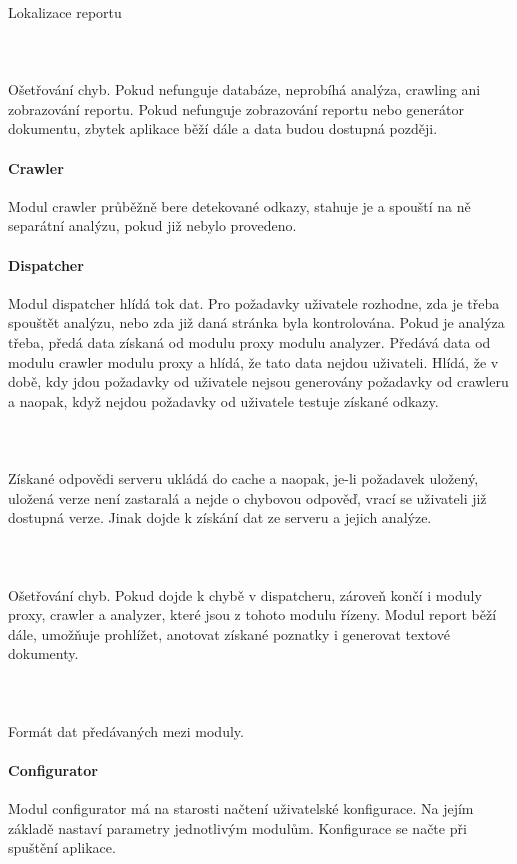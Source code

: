 \documentclass[10pt]{article}
\begin{document}
	\paragraph{~}Lokalizace reportu
	\paragraph{~}Ošetřování chyb. Pokud nefunguje databáze, neprobíhá analýza, crawling ani zobrazování reportu. Pokud nefunguje zobrazování reportu nebo generátor dokumentu, zbytek aplikace běží dále a data budou dostupná později.
	\paragraph{Crawler} Modul crawler průběžně bere detekované odkazy, stahuje je a spouští na ně separátní analýzu, pokud již nebylo provedeno.
	\paragraph{Dispatcher} Modul dispatcher hlídá tok dat. Pro požadavky uživatele rozhodne, zda je třeba spouštět analýzu, nebo zda již daná stránka byla kontrolována. Pokud je analýza třeba, předá data získaná od modulu proxy modulu analyzer. Předává data od modulu crawler modulu proxy a hlídá, že tato data nejdou uživateli. Hlídá, že v době, kdy jdou požadavky od uživatele nejsou generovány požadavky od crawleru a naopak, když nejdou požadavky od uživatele testuje získané odkazy. 
	\paragraph{~} Získané odpovědi serveru ukládá do cache a naopak, je-li požadavek uložený, uložená verze není zastaralá a nejde o chybovou odpověď, vrací se uživateli již dostupná verze. Jinak dojde k získání dat ze serveru a jejich analýze.
	\paragraph{~} Ošetřování chyb. Pokud dojde k chybě v dispatcheru, zároveň končí i moduly proxy, crawler a analyzer, které jsou z tohoto modulu řízeny. Modul report běží dále, umožňuje prohlížet, anotovat získané poznatky i generovat textové dokumenty.
	\paragraph{~} Formát dat předávaných mezi moduly.
	\paragraph{Configurator} Modul configurator má na starosti načtení uživatelské konfigurace. Na jejím základě nastaví parametry jednotlivým modulům.  Konfigurace se načte při spuštění aplikace.
\end{document}
